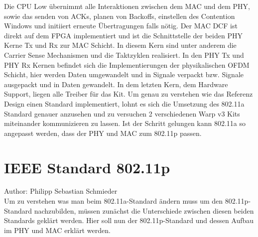 \documentclass[letterpaper,11pt,ngerman]{article}
\begin{document}
\begin{onehalfspace}
Die CPU Low übernimmt alle Interaktionen zwischen dem MAC und dem PHY, sowie das senden von ACKs, planen von Backoffs, einstellen des Contention Windows und initiiert erneute Übertragungen falls nötig.
Der MAC DCF ist direkt auf dem FPGA implementiert und ist die Schnittstelle der beiden PHY Kerne Tx und Rx zur MAC Schicht. In diesem Kern sind unter anderem die Carrier Sense Mechanismen und die Taktzyklen realisiert.
In den PHY Tx und PHY Rx Kernen befindet sich die Implementierungen der physikalischen OFDM Schicht, hier werden Daten umgewandelt und in Signale verpackt bzw. Signale ausgepackt und in Daten gewandelt. In dem letzten Kern, dem Hardware Support, liegen alle Treiber für das Kit.
Um genau zu verstehen wie das Referenz Design einen Standard implementiert, lohnt es sich die Umsetzung des 802.11a Standard genauer anzusehen und zu versuchen 2 verschiedenen Warp v3 Kits miteinander kommunizieren zu lassen. Ist der Schritt gelungen kann 802.11a so angepasst werden, dass der PHY und MAC zum 802.11p passen.
\section{IEEE Standard 802.11p}
\label{802.11p}
\small Author: Philipp Sebastian Schmieder\\
\Large
Um zu verstehen was man beim 802.11a-Standard ändern muss um den 802.11p-Standard nachzubilden, müssen zunächst die Unterschiede zwischen diesen beiden Standards geklärt werden. Hier soll nun der 802.11p-Standard und dessen Aufbau im PHY und MAC erklärt werden.

\end{onehalfspace}
\end{document}
